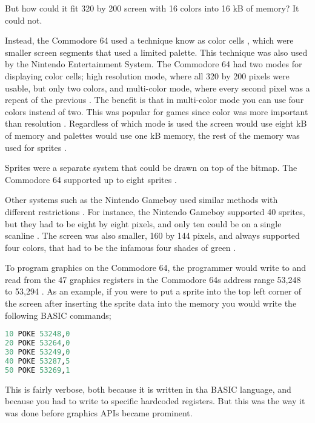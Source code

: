 But how could it fit 320 by 200 screen with 16 colors into 16 kB of memory? It could not.

Instead, the Commodore 64 used a technique know as color cells \cite{commodore1983commodore}, which were smaller screen segments that used a limited palette.
This technique was also used by the Nintendo Entertainment System. 
The Commodore 64 had two modes for displaying color cells; high resolution mode, where all 320 by 200 pixels were usable, but only two colors, and multi-color mode, where every second pixel was a repeat of the previous \cite{commodore1983commodore}.
The benefit is that in multi-color mode you can use four colors instead of two.
This was popular for games since color was more important than resolution \cite{bogdan2014games}.
Regardless of which mode is used the screen would use eight kB of memory and palettes would use one kB memory, the rest of the memory was used for sprites \cite{commodore1983commodore}.

Sprites were a separate system that could be drawn on top of the bitmap.
The Commodore 64 supported up to eight sprites \cite{commodore1983commodore}.

Other systems such as the Nintendo Gameboy used similar methods with different restrictions \cite{nintendo1999gameboy}.
For instance, the Nintendo Gameboy supported 40 sprites, but they had to be eight by eight pixels, and only ten could be on a single scanline \cite{nintendo1999gameboy}. 
The screen was also smaller, 160 by 144 pixels, and always supported four colors, that had to be the infamous four shades of green \cite{nintendo1999gameboy}.

To program graphics on the Commodore 64, the programmer would write to and read from the 47 graphics registers in the Commodore 64s address range 53,248 to 53,294 \cite{commodore1983commodore}.
As an example, if you were to put a sprite into the top left corner of the screen after inserting the sprite data into the memory you would write the following BASIC commands; 

\begin{lstlisting}[caption={Small program that sets the coordinate of sprite 0 to (0,0) (line 1-3), sets the color to green(line 4), and displays it (line 5) (BASIC).}, language=Basic]
10 POKE 53248,0
20 POKE 53264,0
30 POKE 53249,0
40 POKE 53287,5
50 POKE 53269,1
\end{lstlisting}
This is fairly verbose, both because it is written in tha BASIC language, and because you had to write to specific hardcoded registers.
But this was the way it was done before graphics \glspl{API} became prominent.


